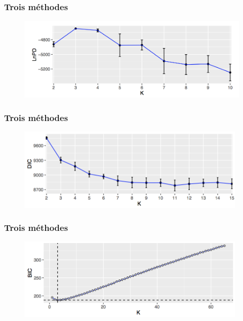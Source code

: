 \documentclass[10pt,xcolor=table]{beamer}\usepackage[]{graphicx}\usepackage[]{color}
\begin{document}
\begin{frame}
	\frametitle{Trois méthodes}
	\begin{figure}
		\begin{center}
		\includegraphics[width=11.5cm]{lnpd1}
	
		\end{center}
	\end{figure}
\end{frame}

\begin{frame}
	\frametitle{Trois méthodes}
	\begin{figure}
		\begin{center}
		\includegraphics[width=11cm]{dic2}
		
		\end{center}
	\end{figure}
\end{frame}

\begin{frame}
	\frametitle{Trois méthodes}
	\begin{figure}
		\begin{center}
\includegraphics[width=11cm]{bic2}
		
		\end{center}
	\end{figure}
\end{frame}
\end{document}
